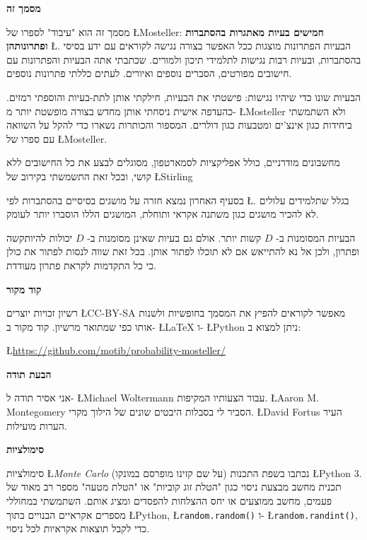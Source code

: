 \medskip

\textbf{מסמך זה}

מסמך זה הוא "עיבוד" לספרו של 
\L{Mosteller}: 
\textbf{חמישים בעיות מאתגרות בהסתברות ופתרונותהן}
\L{\cite{fifty}}.
הבעיות הפתרונות מוצגות ככל האפשר בצורה נגישה לקוראים עם ידע בסיסי בהסתברות, ובעיות רבות נגישות לתלמידי תיכון ולמורים. שכתבתי אתה הבעיות והפתרונות עם חישובים מפורטים, הסברים נוספים ואיורים. לעתים כללתי פתרונות נוספים.

הבעיות שונו כדי שיהיו נגישות: פישטתי את הבעיות, חילקתי אותן לתת-בעיות והוספתי רמזים. כהעדפה אישית ניסחתי אותן מחדש בצורה מופשטת יותר מ-%
\L{Mosteller}
ולא השתמשתי ביחידות כגון אינצ'ים ומטבעות כגון דולרים. המספור והכותרות נשארו כדי להקל על השוואה עם ספרו של
\L{Mosteller}.

מחשבונים מודרניים, כולל אפליקציות לסמארטפון, מסוגלים לבצע את כל החישובים ללא קושי, ובכל זאת התשמשתי בקירוב של
\L{Stirling}

בסעיף האחרון נמצא חזרה על מושגים בסיסיים בהסתברות לפי
\L{\cite{ross}}.
בגלל שתלמידים עלולים לא להכיר מושגים כגון משתנה אקראי ותוחלת, המושגים הללו הוסברו יותר לעומק.

הבעיות המסומנות ב-%
$D$
קשות יותר. אולם גם בעיות שאינן מסומנות ב-%
$D$
יכולות להיותקשה ופתרון, ולכן אל נא להתייאש אם לא תוכלו לפתור אותן. בכל זאת שווה לנסות לפתור את כולן כי כל התקדמות לקראת פתרון מעודדת.

\textbf{קוד מקור}

רשיון זכויות יוצרים 
\L{CC-BY-SA}
מאפשר לקוראים להפיץ את המסמך בחופשיות ולשנות אותו כפי שמתואר מרשיון. קוד מקור ב-%
\L{\LaTeX}
ו-%
\L{Python}
ניתן למצוא ב:
\vspace{-2ex}
\begin{center}
\L{\url{https://github.com/motib/probability-mosteller/}}
\end{center}

\textbf{הבעת תודה}

אני אסיר תודה ל-%
\L{Michael Woltermann}
עבור הצעותיו המקיפות.
\L{Aaron M. Montegomery}
הסביר לי בסבלות היבטים שונים של הילוך מקרי. 
\L{David Fortus}
העיר הערות מועילות.

\textbf{סימולציות}

סימולציות
\L{\emph{Monte Carlo}}
(על שם קזינו מופרסם במונקו) נכתבו בשפת התכנות
\L{Python 3}.
תכנית מחשב מבצעת ניסוי כגון "הטלת זוג קוביות" או "הטלת מטעה" מספר רב מאוד של פעמים, מחשב ממוצעים או יחס ההצלחות להפסדים ומציג אותם. השתמשתי במחוללי מספרים אקראיים הבנויים בתוך
\L{Python},
\L{\texttt{random.random()}}
ו-%
\L{\texttt{random.randint()}},
כדי לקבל תוצאות אקראיות לכל ניסוי.

